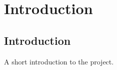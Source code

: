 \chapter{Introduction}
\label{chapter:introduction}
\section{Introduction}
A short introduction to the project.
